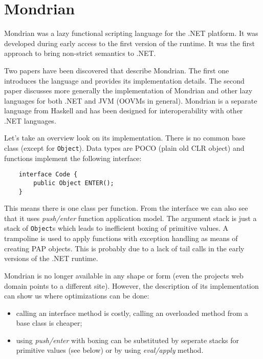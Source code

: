 \documentclass[en]{pracamgr}
\begin{document}
\section{Mondrian}

Mondrian was a lazy functional scripting language for
the .NET platform. It was developed during early access
to the first version of the runtime.
It was the first approach to bring non-strict
semantics to .NET.

Two papers have been discovered that
describe Mondrian. The first one \cite{MondrianImplDetails}
introduces the language and provides its implementation details.
The second paper \cite{PerryMeijer} discusses more generally
the implementation of Mondrian and other lazy languages
for both .NET and JVM (OOVMs in general).
Mondrian is a separate language from Haskell and has
been designed for interoperability with other .NET languages.

Let's take an overview look on its implementation.
There is no common base class (except for \texttt{Object}).
Data types are POCO (plain old CLR object) and functions
implement the following interface:
\begin{verbatim}
    interface Code {
        public Object ENTER();
    }
\end{verbatim}

This means there is one class per function.
From the interface we can also see that it uses
\textit{push/enter} function application model.
The argument stack is just a stack of \texttt{Object}s
which leads to inefficient boxing of primitive values.
A trampoline is used to apply functions with exception handling
as means of creating PAP objects.
This is probably due to a lack of tail calls in the early
versions of the .NET runtime.

Mondrian is no longer available in any shape or form
(even the projects web domain points to a different site).
However, the description of its implementation can show us
where optimizations can be done:

\begin{itemize}
    \item calling an interface method is costly, calling an
            overloaded method from a base class is cheaper;
    \item using \textit{push/enter} with boxing can be substituted
            by seperate stacks for primitive values (see below)
            or by using \textit{eval/apply} method.
\end{itemize}
\end{document}
